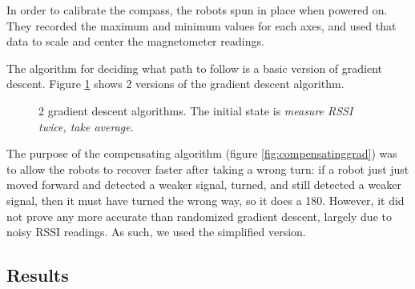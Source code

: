 \documentclass[]{article}
\begin{document}
In order to calibrate the compass, the robots spun in place when powered
on.
They recorded the maximum and minimum values for each axes, and used
that data to scale and center the magnetometer readings.

The algorithm for deciding what path to follow is a basic version of
gradient descent. Figure \ref{fig:graddesc} shows 2 versions of the gradient descent algorithm.

\begin{figure}
  \centering
  \caption{2 gradient descent algorithms. The initial state is \emph{measure RSSI twice, take average}.}
  \label{fig:graddesc}
\end{figure}

The purpose of the compensating algorithm (figure \ref{fig:compensatinggrad}) was to allow the robots to recover faster after taking a wrong turn: if a robot just just moved forward and detected a weaker signal, turned, and still detected a weaker signal, then it must have turned the wrong way, so it does a 180.
However, it did not prove any more accurate than randomized gradient descent, largely due to noisy RSSI readings.
As such, we used the simplified version.

\subsection{Results}
\end{document}
